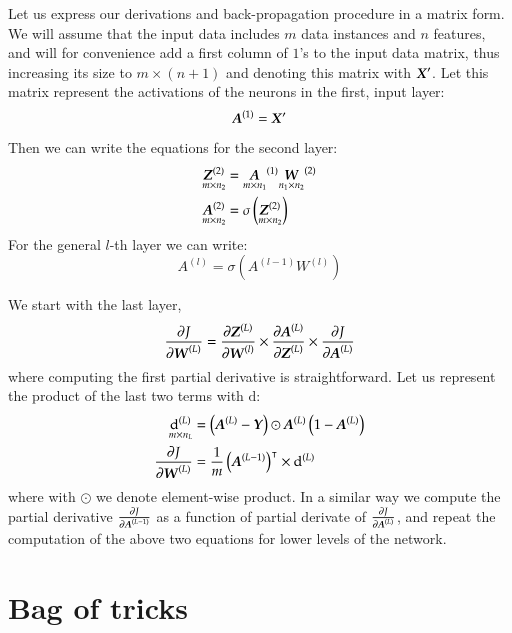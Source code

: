 \begin{refsection}
Let us express our derivations and back-propagation procedure in a matrix form. We will assume that the input data includes $m$ data instances and $n$ features, and will for convenience add a first column of $1$'s to the input data matrix, thus increasing its size to $m\times (n+1)$ and denoting this matrix with $\boldsymbol{X}'$. Let this matrix represent the activations of the neurons in the first, input layer:
\begin{equation}
\boldsymbol{A}^{(1)}=\boldsymbol{X}'
\end{equation}
Then we can write the equations for the second layer:
\begin{align}
\underset{m\times n_2}{\boldsymbol{Z}^{(2)}} & = \underset{m\times n_1}{\boldsymbol{A}}^{(1)} \underset{n_1\times n_2}{\boldsymbol{W}}^{(2)} \\
\underset{m\times n_2}{\boldsymbol{A}^{(2)}} & = \sigma\left( \underset{m\times n_2}{\boldsymbol{Z}^{(2)}} \right)
\end{align}
For the general $l$-th layer we can write:
\begin{equation}
A^{(l)} = \sigma\left(A^{(l-1)} W^{(l)}\right)
\end{equation}

We start with the last layer,
\begin{equation}
\frac{\partial J}{\partial\boldsymbol{W}^{(L)}} = \frac{\partial\boldsymbol{Z}^{(L)}}{\partial\boldsymbol{W}^{(l)}} \times \frac{\partial\boldsymbol{A}^{(L)}}{\partial\boldsymbol{Z}^{(L)}} \times \frac{\partial J}{\partial\boldsymbol{A}^{(L)}}
\end{equation}
where computing the first partial derivative is straightforward. Let us represent the product of the last two terms with $\mathrm{d}$:
\begin{align}
\underset{m\times n_L}{\mathrm{d}^{(L)}} & = \left(\boldsymbol{A}^{(L)}-\boldsymbol{Y} \right)  \odot \boldsymbol{A}^{(L)} \left( 1-\boldsymbol{A}^{(L)}\right) \\
\frac{\partial J}{\partial\boldsymbol{W}^{(L)}} & = {1\over m} \left(\boldsymbol{A}^{(L-1)} \right)^\intercal \times \mathrm{d}^{(L)}
\end{align}
where with $\odot$ we denote element-wise product. In a similar way we compute the partial derivative $\frac{\partial J}{\partial\boldsymbol{A}^{(L-1)}}$ as a function of partial derivate of $\frac{\partial J}{\partial\boldsymbol{A}^{(L)}}$, and repeat the computation of the above two equations for lower levels of the network.

\section{Bag of tricks}


\end{refsection}
